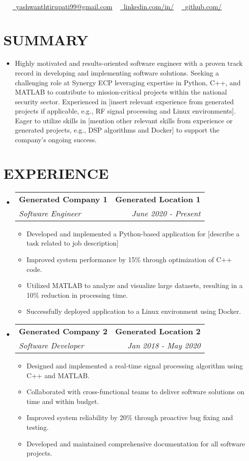 \documentclass[letterpaper,11pt]{article}
\makeatletter
\newcommand{\resumeItem}[1]{\item\small{{#1 \vspace{-3pt}}}}
\newcommand{\resumeSubheading}[4]{\vspace{-2pt}\item\begin{tabular*}{0.97\textwidth}[t]{l@{\extracolsep{\fill}}r}\textbf{#1} & #2 \\ \textit{\small#3} & \textit{\small #4} \\ \end{tabular*}\vspace{-7pt}}
\newcommand{\resumeSubHeadingListStart}{\begin{itemize}[leftmargin=0.15in, label={}]}
\newcommand{\resumeSubHeadingListEnd}{\end{itemize}}
\newcommand{\resumeItemListStart}{\begin{itemize}}
\newcommand{\resumeItemListEnd}{\end{itemize}\vspace{-5pt}}
\makeatother
\begin{document}
\begin{center}
    \textbf{\Huge \scshape {\fontsize{15pt}{20pt}\selectfont }} \\ \vspace{1pt}
    \small \raisebox{-0.1\height}\faPhone\  ~ \href{mailto:yashwanthtirupati99@gmail.com}{\raisebox{-0.2\height}\faEnvelope\  \underline{yashwanthtirupati99@gmail.com}} ~ 
    \href{}{\raisebox{-0.2\height}\faLinkedin\ \underline{linkedin.com/in/}} ~ 
    \href{}{\raisebox{-0.2\height}\faGithub\ \underline{github.com/}}
    \vspace{-8pt}
\end{center}

\section{{\fontsize{9pt}{20pt}\selectfont \textbf{SUMMARY}}}\resumeSubHeadingListStart
\resumeItem{Highly motivated and results-oriented software engineer with a proven track record in developing and implementing software solutions.  Seeking a challenging role at Synergy ECP leveraging expertise in Python, C++, and MATLAB to contribute to mission-critical projects within the national security sector.  Experienced in [insert relevant experience from generated projects if applicable, e.g.,  RF signal processing and Linux environments]. Eager to utilize skills in [mention other relevant skills from experience or generated projects, e.g.,  DSP algorithms and Docker] to support the company's ongoing success.}
\resumeSubHeadingListEnd\vspace{-18pt}
\section{{\fontsize{9pt}{20pt}\selectfont \textbf{EXPERIENCE}}}\resumeSubHeadingListStart
\resumeSubheading{Generated Company 1}{\textbf{Generated Location 1}}{Software Engineer}{June 2020 - Present}
\resumeItemListStart
\resumeItem{Developed and implemented a Python-based application for [describe a task related to job description]}
\resumeItem{Improved system performance by 15\% through optimization of C++ code.}
\resumeItem{Utilized MATLAB to analyze and visualize large datasets, resulting in a 10\% reduction in processing time.}
\resumeItem{Successfully deployed application to a Linux environment using Docker.}
\resumeItemListEnd
\resumeSubheading{Generated Company 2}{\textbf{Generated Location 2}}{Software Developer}{Jan 2018 - May 2020}
\resumeItemListStart
\resumeItem{Designed and implemented a real-time signal processing algorithm using C++ and MATLAB.}
\resumeItem{Collaborated with cross-functional teams to deliver software solutions on time and within budget.}
\resumeItem{Improved system reliability by 20\% through proactive bug fixing and testing.}
\resumeItem{Developed and maintained comprehensive documentation for all software projects.}
\resumeItemListEnd
\resumeSubHeadingListEnd\vspace{-17pt}
\end{document}
